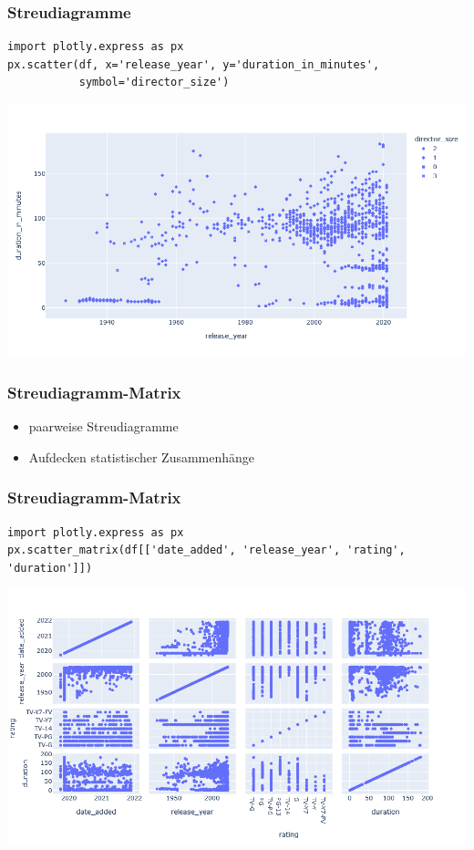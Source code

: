 \begin{frame}[fragile]
\frametitle{Streudiagramme}

\begin{verbatim}
import plotly.express as px
px.scatter(df, x='release_year', y='duration_in_minutes',
           symbol='director_size')
\end{verbatim}

\vspace{-\baselineskip}

\begin{center}
\includegraphics[width=0.80\linewidth]{fig5/scatter4.png}
\end{center}
\end{frame}


\begin{frame}
\frametitle{Streudiagramm-Matrix}

\begin{itemize}
	\item paarweise Streudiagramme
	\item Aufdecken statistischer Zusammenhänge
\end{itemize}
\end{frame}


\begin{frame}[fragile]
\frametitle{Streudiagramm-Matrix}

\begin{verbatim}
import plotly.express as px
px.scatter_matrix(df[['date_added', 'release_year', 'rating', 'duration']])
\end{verbatim}

\vspace{-\baselineskip}

\begin{center}
\includegraphics[width=0.80\linewidth]{fig5/matrix1.png}
\end{center}
\end{frame}


